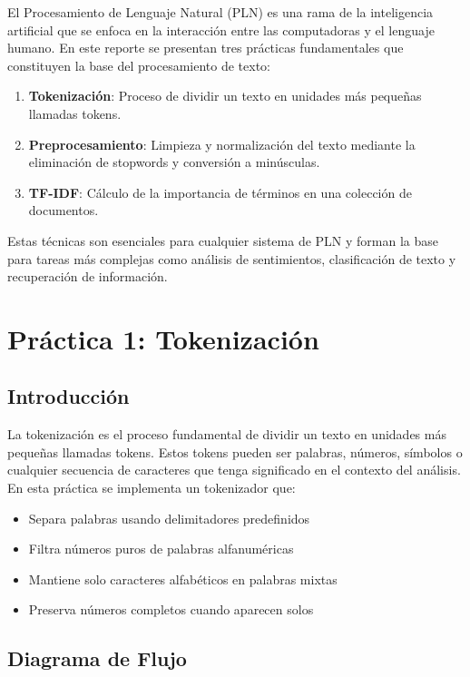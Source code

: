 \documentclass[12pt,a4paper]{article}
\begin{document}
El Procesamiento de Lenguaje Natural (PLN) es una rama de la inteligencia artificial que se enfoca en la interacción entre las computadoras y el lenguaje humano. En este reporte se presentan tres prácticas fundamentales que constituyen la base del procesamiento de texto:

\begin{enumerate}
    \item \textbf{Tokenización}: Proceso de dividir un texto en unidades más pequeñas llamadas tokens.
    \item \textbf{Preprocesamiento}: Limpieza y normalización del texto mediante la eliminación de stopwords y conversión a minúsculas.
    \item \textbf{TF-IDF}: Cálculo de la importancia de términos en una colección de documentos.
\end{enumerate}

Estas técnicas son esenciales para cualquier sistema de PLN y forman la base para tareas más complejas como análisis de sentimientos, clasificación de texto y recuperación de información.

\newpage

\section{Práctica 1: Tokenización}

\subsection{Introducción}

La tokenización es el proceso fundamental de dividir un texto en unidades más pequeñas llamadas tokens. Estos tokens pueden ser palabras, números, símbolos o cualquier secuencia de caracteres que tenga significado en el contexto del análisis. En esta práctica se implementa un tokenizador que:

\begin{itemize}
    \item Separa palabras usando delimitadores predefinidos
    \item Filtra números puros de palabras alfanuméricas
    \item Mantiene solo caracteres alfabéticos en palabras mixtas
    \item Preserva números completos cuando aparecen solos
\end{itemize}

\subsection{Diagrama de Flujo}
\end{document}
